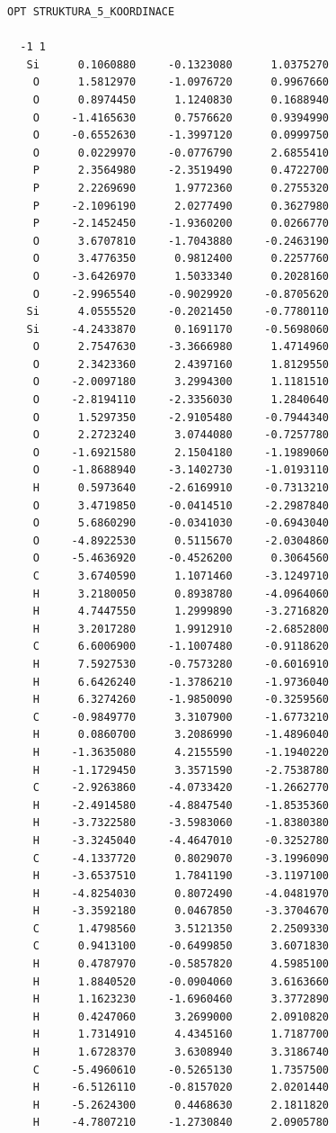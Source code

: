 \documentclass[
  digital, %
  table,   %
  lof,     %
  lot,     %
  oneside,
]{fithesis3}
\begin{document}
  \begin{lstlisting}[frame=single, caption={struktura koordinace 5},label=DescriptiveLabel]
  OPT STRUKTURA_5_KOORDINACE

  -1 1
   Si      0.1060880     -0.1323080      1.0375270
    O      1.5812970     -1.0976720      0.9967660
    O      0.8974450      1.1240830      0.1688940
    O     -1.4165630      0.7576620      0.9394990
    O     -0.6552630     -1.3997120      0.0999750
    O      0.0229970     -0.0776790      2.6855410
    P      2.3564980     -2.3519490      0.4722700
    P      2.2269690      1.9772360      0.2755320
    P     -2.1096190      2.0277490      0.3627980
    P     -2.1452450     -1.9360200      0.0266770
    O      3.6707810     -1.7043880     -0.2463190
    O      3.4776350      0.9812400      0.2257760
    O     -3.6426970      1.5033340      0.2028160
    O     -2.9965540     -0.9029920     -0.8705620
   Si      4.0555520     -0.2021450     -0.7780110
   Si     -4.2433870      0.1691170     -0.5698060
    O      2.7547630     -3.3666980      1.4714960
    O      2.3423360      2.4397160      1.8129550
    O     -2.0097180      3.2994300      1.1181510
    O     -2.8194110     -2.3356030      1.2840640
    O      1.5297350     -2.9105480     -0.7944340
    O      2.2723240      3.0744080     -0.7257780
    O     -1.6921580      2.1504180     -1.1989060
    O     -1.8688940     -3.1402730     -1.0193110
    H      0.5973640     -2.6169910     -0.7313210
    O      3.4719850     -0.0414510     -2.2987840
    O      5.6860290     -0.0341030     -0.6943040
    O     -4.8922530      0.5115670     -2.0304860
    O     -5.4636920     -0.4526200      0.3064560
    C      3.6740590      1.1071460     -3.1249710
    H      3.2180050      0.8938780     -4.0964060
    H      4.7447550      1.2999890     -3.2716820
    H      3.2017280      1.9912910     -2.6852800
    C      6.6006900     -1.1007480     -0.9118620
    H      7.5927530     -0.7573280     -0.6016910
    H      6.6426240     -1.3786210     -1.9736040
    H      6.3274260     -1.9850090     -0.3259560
    C     -0.9849770      3.3107900     -1.6773210
    H      0.0860700      3.2086990     -1.4896040
    H     -1.3635080      4.2155590     -1.1940220
    H     -1.1729450      3.3571590     -2.7538780
    C     -2.9263860     -4.0733420     -1.2662770
    H     -2.4914580     -4.8847540     -1.8535360
    H     -3.7322580     -3.5983060     -1.8380380
    H     -3.3245040     -4.4647010     -0.3252780
    C     -4.1337720      0.8029070     -3.1996090
    H     -3.6537510      1.7841190     -3.1197100
    H     -4.8254030      0.8072490     -4.0481970
    H     -3.3592180      0.0467850     -3.3704670
    C      1.4798560      3.5121350      2.2509330
    C      0.9413100     -0.6499850      3.6071830
    H      0.4787970     -0.5857820      4.5985100
    H      1.8840520     -0.0904060      3.6163660
    H      1.1623230     -1.6960460      3.3772890
    H      0.4247060      3.2699000      2.0910820
    H      1.7314910      4.4345160      1.7187700
    H      1.6728370      3.6308940      3.3186740
    C     -5.4960610     -0.5265130      1.7357500
    H     -6.5126110     -0.8157020      2.0201440
    H     -5.2624300      0.4468630      2.1811820
    H     -4.7807210     -1.2730840      2.0905780


\end{lstlisting}
\end{document}
